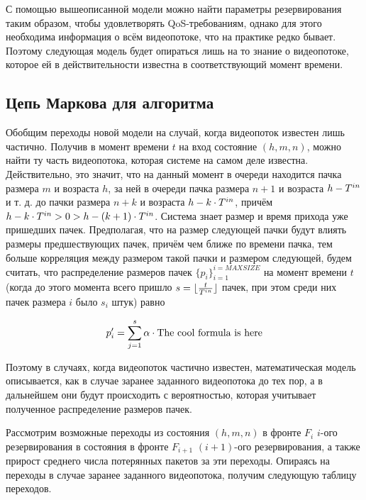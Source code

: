 С помощью вышеописанной модели можно найти параметры резервирования таким образом, чтобы удовлетворять QoS-требованиям, однако для этого необходима информация о всём видеопотоке, что на практике редко бывает. Поэтому следующая модель будет опираться лишь на то знание о видеопотоке, которое ей в действительности известна в соответствующий момент времени.

\subsection{Цепь Маркова для алгоритма}

Обобщим переходы новой модели на случай, когда видеопоток известен лишь частично.
Получив в момент времени $t$ на вход состояние $(h,m,n)$, можно найти ту часть видеопотока, которая системе на самом деле известна.
Действительно, это значит, что на данный момент в очереди находится пачка размера $m$ и возраста $h$, за ней в очереди пачка размера $n+1$ и возраста $h - T^{in}$ и т. д. до пачки размера $n + k$ и возраста $h - k \cdot T^{in}$, причём $h - k \cdot T^{in} > 0 > h - (k + 1) \cdot T^{in}$.
Система знает размер и время прихода уже пришедших пачек. Предполагая, что на размер следующей пачки будут влиять размеры предшествующих пачек, причём чем ближе по времени пачка, тем больше корреляция между размером такой пачки и размером следующей, будем считать, что распределение размеров пачек $\{ p_i \}_{i = 1}^{i = MAXSIZE}$ на момент времени $t$ (когда до этого момента всего пришло $s = \lfloor\frac{t}{T^{in}}\rfloor$ пачек, при этом среди них пачек размера $i$ было $s_i$ штук) равно

$$
p'_i = \sum\limits_{j = 1}^{s} \alpha\cdot   \hbox{The cool formula is here}
$$

Поэтому в случаях, когда видеопоток частично известен, математическая модель описывается, как в случае заранее заданного видеопотока до тех пор, а в дальнейшем они будут происходить с вероятностью, которая учитывает полученное распределение размеров пачек.

Рассмотрим возможные переходы из состояния $(h,m,n)$ в фронте $F_i$ $i$-ого резервирования в состояния в фронте $F_{i + 1}$ $(i+1)$-ого резервирования, а также прирост среднего числа потерянных пакетов за эти переходы. Опираясь на переходы в случае заранее заданного видеопотока, получим следующую таблицу переходов.

